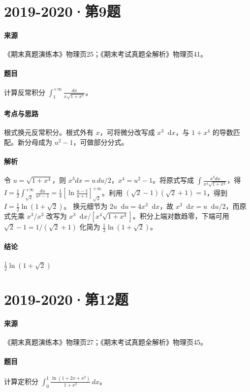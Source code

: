 \documentclass[UTF8,fontset=fandol,12pt,oneside,openany]{ctexrep}
\newcommand{\dd}{\mathop{}\!\mathrm d}
\theoremstyle{definition}
\begin{document}
\par\addvspace{18pt}\noindent\begin{minipage}{\linewidth}
\section{2019-2020·第9题}
\label{exam:11:q17}
\paragraph{来源} 《期末真题演练本》物理页25；《期末考试真题全解析》物理页41。
\paragraph{题目}
计算反常积分 $\int_1^{+\infty}\frac{dx}{x\sqrt{1+x^4}}$。
\end{minipage}\par
\paragraph{考点与思路}
根式换元反常积分。根式外有 $x$，可将微分改写成 $x^3\dd x$，与 $1+x^4$ 的导数匹配。新分母成为 $u^2-1$，可做部分分式。
\paragraph{解析}
令 $u=\sqrt{1+x^4}$，则 $x^3dx=u\,du/2$，$x^4=u^2-1$。将原式写成 $\int\frac{x^3dx}{x^4\sqrt{1+x^4}}$，得 $I=\frac12\int_{\sqrt2}^{+\infty}\frac{du}{u^2-1}=\frac14[\ln\frac{u-1}{u+1}]_{\sqrt2}^{+\infty}$。利用 $(\sqrt2-1)(\sqrt2+1)=1$，得到 $I=\frac12\ln(1+\sqrt2)$。
换元细节为 $2u\dd u=4x^3\dd x$，故 $x^3\dd x=u\dd u/2$，而原式先乘 $x^3/x^3$ 改写为 $x^3\dd x/[x^4\sqrt{1+x^4}]$。积分上端对数趋零，下端可用 $\sqrt2-1=1/(\sqrt2+1)$ 化简为 $\frac12\ln(1+\sqrt2)$。
\paragraph{结论}
$\frac12\ln(1+\sqrt2)$

\par\addvspace{18pt}\noindent\begin{minipage}{\linewidth}
\section{2019-2020·第12题}
\label{exam:11:q18}
\paragraph{来源} 《期末真题演练本》物理页27；《期末考试真题全解析》物理页45。
\paragraph{题目}
计算定积分 $\int_0^1\frac{\ln(1+2x+x^2)}{1+x^2}\,dx$。
\end{minipage}\par
\end{document}
